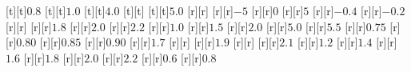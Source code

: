 \begin{psfrags}
[t][t]{$0.8$}%
[t][t]{$1.0$}%
[t][t]{$4.0$}%
[t][t]{}%
[t][t]{$5.0$}%
%
[r][r]{}%
[r][r]{$-5$}%
[r][r]{$0$}%
[r][r]{$5$}%
[r][r]{$-0.4$}%
[r][r]{$-0.2$}%
[r][r]{}%
[r][r]{$1.8$}%
[r][r]{$2.0$}%
[r][r]{$2.2$}%
[r][r]{$1.0\!$}%
[r][r]{$1.5$}%
[r][r]{$2.0$}%
[r][r]{$5.0$}%
[r][r]{$5.5$}%
[r][r]{$0.75$}%
[r][r]{$0.80$}%
[r][r]{$0.85$}%
[r][r]{$0.90$}%
[r][r]{$1.7$}%
[r][r]{}%
[r][r]{$1.9$}%
[r][r]{}%
[r][r]{$2.1$}%
[r][r]{$1.2$}%
[r][r]{$1.4$}%
[r][r]{$1.6$}%
[r][r]{$1.8$}%
[r][r]{$2.0$}%
[r][r]{$2.2$}%
[r][r]{$0.6\!$}%
[r][r]{$0.8$}%
%
%
\end{psfrags}%
%
